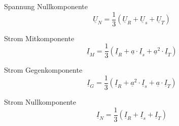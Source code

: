 \documentclass[11pt, a4paper, draft, fleqn, twocolumn]{article}
\numberwithin{equation}{subsection}
\begin{document}
\noindent Spannung Nullkomponente
\begin{equation}
    \underline{U}_N = \frac{1}{3}(\underline{U}_R + \underline{U}_s + \underline{U}_T)
\end{equation}

\noindent Strom Mitkomponente
\begin{equation}
    \underline{I}_M = \frac{1}{3}(\underline{I}_R + \underline{a} \cdot \underline{I}_s + \underline{a}^2 \cdot \underline{I}_T)
\end{equation}

\noindent Strom Gegenkomponente
\begin{equation}
    \underline{I}_G = \frac{1}{3}(\underline{I}_R + \underline{a}^2 \cdot \underline{I}_s + \underline{a} \cdot \underline{I}_T)
\end{equation}

\noindent Strom Nullkomponente
\begin{equation}
    \underline{I}_N = \frac{1}{3}(\underline{I}_R + \underline{I}_s + \underline{I}_T)
\end{equation}
\end{document}
